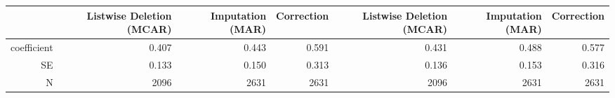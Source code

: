 \begin{table}[ht]
\centering
\begin{tabular}{rrrrrrr}
  \hline
 & Listwise Deletion (MCAR) & Imputation (MAR) & Correction & Listwise Deletion (MCAR) & Imputation (MAR) & Correction \\ 
  \hline
coefficient & 0.407 & 0.443 & 0.591 & 0.431 & 0.488 & 0.577 \\ 
  SE & 0.133 & 0.150 & 0.313 & 0.136 & 0.153 & 0.316 \\ 
  N & 2096 & 2631 & 2631 & 2096 & 2631 & 2631 \\ 
   \hline
\end{tabular}
\end{table}
